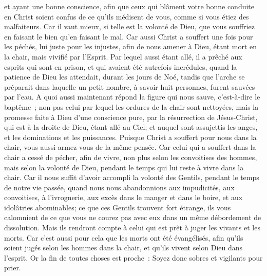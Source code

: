 \begin{multicols}{2}
et ayant une bonne conscience, afin que ceux qui blâment votre bonne conduite en Christ soient confus de ce qu'ils médisent de vous, comme si vous étiez des malfaiteurs.
Car il vaut mieux, si telle est la volonté de Dieu, que vous souffriez en faisant le bien qu'en faisant le mal.
Car aussi Christ a souffert une fois pour les péchés, lui juste pour les injustes, afin de nous amener à Dieu, étant mort en la chair, mais vivifié par l'Esprit.
Par lequel aussi étant allé, il a prêché aux esprits qui sont en prison,
et qui avaient été autrefois incrédules, quand la patience de Dieu les attendait, durant les jours de Noé, tandis que l'arche se préparait dans laquelle un petit nombre, à savoir huit personnes, furent sauvées par l'eau.
A quoi aussi maintenant répond la figure qui nous sauve, c'est-à-dire le baptême~; non pas celui par lequel les ordures de la chair sont nettoyées, mais la promesse faite à Dieu d'une conscience pure, par la résurrection de Jésus-Christ,
qui est à la droite de Dieu, étant allé au Ciel; et auquel sont assujettis les anges, et les dominations et les puissances.
\VerseOne{}Puisque Christ a souffert pour nous dans la chair, vous aussi armez-vous de la même pensée. Car celui qui a souffert dans la chair a cessé de pécher,
afin de vivre, non plus selon les convoitises des hommes, mais selon la volonté de Dieu, pendant le temps qui lui reste à vivre dans la chair.
Car il nous suffit d'avoir accompli la volonté des Gentils, pendant le temps de notre vie passée, quand nous nous abandonnions aux impudicités, aux convoitises, à l'ivrognerie, aux excès dans le manger et dans le boire, et aux idolâtries abominables;
ce que ces Gentils trouvent fort étrange, ils vous calomnient de ce que vous ne courez pas avec eux dans un même débordement de dissolution. 
Mais ils rendront compte à celui qui est prêt à juger les vivants et les morts.
Car c'est aussi pour cela que les morts ont été évangélisés, afin qu'ils soient jugés selon les hommes dans la chair, et qu'ils vivent selon Dieu dans l'esprit. 
Or la fin de toutes choses est proche~: Soyez donc sobres et vigilants pour prier. 

\end{multicols}
